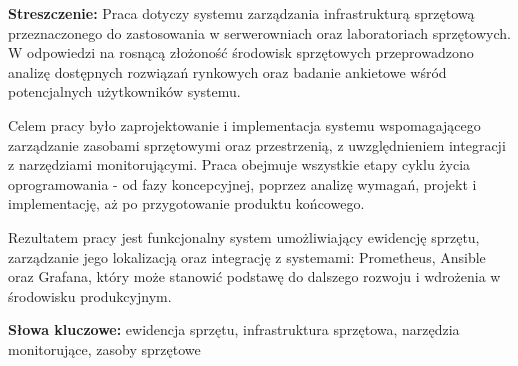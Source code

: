 \textbf{Streszczenie: }
Praca dotyczy systemu zarządzania infrastrukturą sprzętową przeznaczonego do zastosowania w serwerowniach oraz laboratoriach sprzętowych.
W odpowiedzi na rosnącą złożoność środowisk sprzętowych przeprowadzono analizę dostępnych rozwiązań rynkowych oraz badanie ankietowe wśród potencjalnych użytkowników systemu.
\par Celem pracy było zaprojektowanie i implementacja systemu wspomagającego zarządzanie zasobami sprzętowymi oraz przestrzenią, z uwzględnieniem integracji z narzędziami monitorującymi.
Praca obejmuje wszystkie etapy cyklu życia oprogramowania - od fazy koncepcyjnej, poprzez analizę wymagań, projekt i implementację, aż po przygotowanie produktu końcowego.
\par Rezultatem pracy jest funkcjonalny system umożliwiający ewidencję sprzętu, zarządzanie jego lokalizacją oraz integrację z systemami: \gls{Prometheus}, \gls{Ansible} oraz \gls{Grafana}, który może stanowić podstawę do dalszego rozwoju i wdrożenia w środowisku produkcyjnym.\par

\vspace{1cm}

\textbf{Słowa kluczowe: }
ewidencja sprzętu, infrastruktura sprzętowa, narzędzia monitorujące, zasoby sprzętowe
